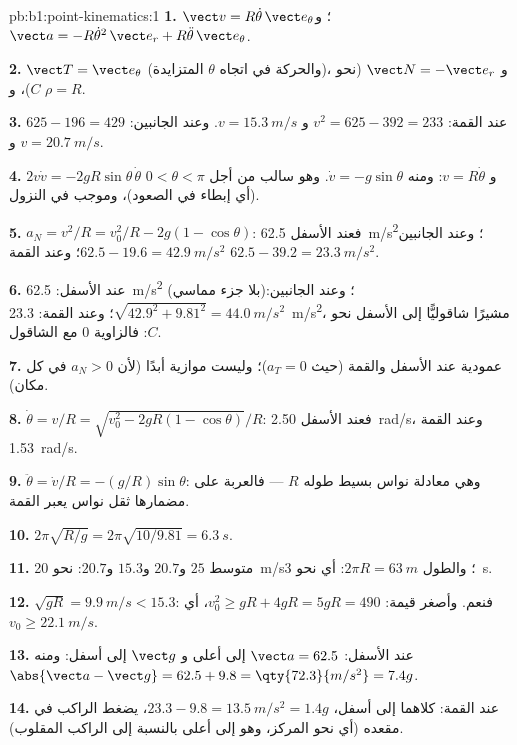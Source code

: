 \begin{solution}{pb:b1:point-kinematics:1}
\textbf{1.} $\vect v = R\dot\theta\,\vect e_\theta$؛ و$\vect a = -R\dot\theta^2
\,\vect e_r + R\ddot\theta\,\vect e_\theta$.

\textbf{2.} $\vect T = \vect e_\theta$ (والحركة في اتجاه $\theta$ المتزايدة)، و
$\vect N = -\vect e_r$ (نحو $C$)، و $\rho = R$.

\textbf{3.} عند القمة: $v^2 = 625 - 392 = 233$ و $v = \qty{15.3}{m/s}$. وعند الجانبين:
$625 - 196 = 429$ و $v = \qty{20.7}{m/s}$.

\textbf{4.} $2v\dot v = -2gR\sin\theta\,\dot\theta$ و $v = R\dot\theta$:
ومنه $\dot v = -g\sin\theta$. وهو سالب من أجل $0 < \theta < \pi$ (أي إبطاء في
الصعود)، وموجب في النزول.

\textbf{5.} $a_N = v^2/R = v_0^2/R - 2g(1 - \cos\theta)$: فعند الأسفل
\qty{62.5}{m/s^2}؛ وعند الجانبين $62.5 - 19.6 = \qty{42.9}{m/s^2}$؛ وعند القمة $62.5 -
39.2 = \qty{23.3}{m/s^2}$.

\textbf{6.} عند الأسفل: \qty{62.5}{m/s^2} (بلا جزء مماسي)؛ وعند الجانبين:
$\sqrt{42.9^2 + 9.81^2} = \qty{44.0}{m/s^2}$؛ وعند القمة: \qty{23.3}{m/s^2}،
مشيرًا شاقوليًّا إلى الأسفل نحو $C$: فالزاوية $0$ مع الشاقول.

\textbf{7.} عمودية عند الأسفل والقمة (حيث $a_T = 0$)؛ وليست موازية
أبدًا (لأن $a_N > 0$ في كل مكان).

\textbf{8.} $\dot\theta = v/R = \sqrt{v_0^2 - 2gR(1 - \cos\theta)}/R$:
فعند الأسفل \qty{2.50}{rad/s}، وعند القمة \qty{1.53}{rad/s}.

\textbf{9.} $\ddot\theta = \dot v/R = -(g/R)\sin\theta$: وهي معادلة
نواس بسيط طوله $R$ --- فالعربة على مضمارها ثقل نواس
يعبر القمة.

\textbf{10.} $2\pi\sqrt{R/g} = 2\pi\sqrt{10/9.81} = \qty{6.3}{s}$.

\textbf{11.} متوسط $25$ و$20.7$ و$15.3$ و$20.7$: نحو \qty{20}{m/s}؛
والطول $2\pi R = \qty{63}{m}$: أي نحو \qty{3}{s}.

\textbf{12.} $\sqrt{gR} = \qty{9.9}{m/s} < 15.3$: فنعم. وأصغر قيمة: $v_0^2 \geq
gR + 4gR = 5gR = 490$، أي $v_0 \geq \qty{22.1}{m/s}$.

\textbf{13.} عند الأسفل: $\vect a = 62.5$ إلى أعلى و $\vect g$ إلى أسفل:
ومنه $\abs{\vect a - \vect g} = 62.5 + 9.8 = \qty{72.3}{m/s^2} = 7.4g$.

\textbf{14.} عند القمة: كلاهما إلى أسفل، $23.3 - 9.8 = \qty{13.5}{m/s^2} = 1.4g$،
يضغط الراكب في مقعده (أي نحو المركز، وهو إلى أعلى بالنسبة إلى
الراكب المقلوب).


\end{solution}
